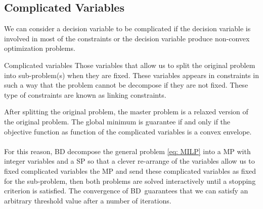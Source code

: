 \subsection{Complicated Variables}
We can consider a decision variable to be complicated if the decision variable is involved in most of the constraints or the decision variable produce non-convex optimization problems. 
\begin{definition}{Complicated variables}{}
Those variables that allow us to split the original problem into sub-problem(s) when they are fixed. These variables appears in constraints in such a way that the problem cannot be decompose if they are not fixed. These type of constraints are known as linking constraints. 
\end{definition}
After splitting the original problem, the master problem is a relaxed version of the original problem. The global minimum is guarantee if and only if the objective function as function of the complicated variables is a convex envelope.\\\\
For this reason, BD decompose the general problem \eqref{eq: MILP} into a MP with integer variables and a SP so that a clever re-arrange of the variables allow us to fixed complicated variables the MP and send these complicated variables as fixed for the sub-problem, then both problems are solved interactively until a stopping criterion is satisfied. The convergence of BD\,\cite{Sahinidis1991BDConvergence} guarantees that we can satisfy an arbitrary threshold value after a number of iterations. 
